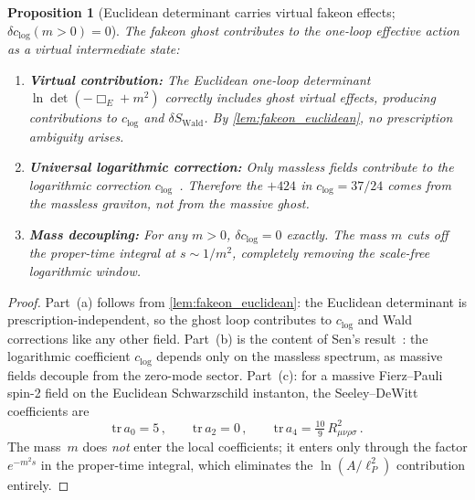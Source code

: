 \documentclass[11pt,a4paper]{article}
\theoremstyle{plain}
\newtheorem{proposition}[theorem]{Proposition}
\theoremstyle{definition}
\begin{document}
\begin{proposition}[Euclidean determinant carries virtual fakeon effects;
  $\delta c_{\log}(m > 0) = 0$]%
\label{prop:euclidean_virtual}
  The fakeon ghost contributes to the one-loop effective action
  as a virtual intermediate state:
  \begin{enumerate}[label=\textup{(\alph*)}]
    \item \textbf{Virtual contribution:} The Euclidean one-loop
      determinant $\ln\det(-\Box_E + m^2)$ correctly includes ghost
      virtual effects, producing contributions to $c_{\log}$ and
      $\delta S_{\mathrm{Wald}}$.  By \cref{lem:fakeon_euclidean},
      no prescription ambiguity arises.
    \item \textbf{Universal logarithmic correction:} Only massless
      fields contribute to the logarithmic correction
      $c_{\log}$~\cite{Sen2012}.  Therefore the $+424$ in
      $c_{\log} = 37/24$ comes from the massless graviton, not
      from the massive ghost.
    \item \textbf{Mass decoupling:} For any $m > 0$,
      $\delta c_{\log} = 0$ exactly.  The mass $m$ cuts off the
      proper-time integral at $s \sim 1/m^2$, completely removing
      the scale-free logarithmic window.
  \end{enumerate}
\end{proposition}

\begin{proof}
  Part~(a) follows from \cref{lem:fakeon_euclidean}: the Euclidean
  determinant is prescription-independent, so the ghost loop contributes
  to $c_{\log}$ and Wald corrections like any other field.
  Part~(b) is the content of Sen's result~\cite{Sen2012}: the
  logarithmic coefficient $c_{\log}$ depends only on the massless
  spectrum, as massive fields decouple from the zero-mode sector.
  Part~(c): for a massive Fierz--Pauli spin-2 field on the Euclidean
  Schwarzschild instanton, the Seeley--DeWitt coefficients
  are~\cite{Farolfi2025}
  \[
    \mathrm{tr}\,a_0 = 5\,,\qquad
    \mathrm{tr}\,a_2 = 0\,,\qquad
    \mathrm{tr}\,a_4 = \tfrac{10}{9}\,R_{\mu\nu\rho\sigma}^2\,.
  \]
  The mass~$m$ does \emph{not} enter the local coefficients; it enters
  only through the factor $e^{-m^2 s}$ in the proper-time integral,
  which eliminates the $\ln(A/\ell_P^2)$ contribution entirely.
\end{proof}
\end{document}
